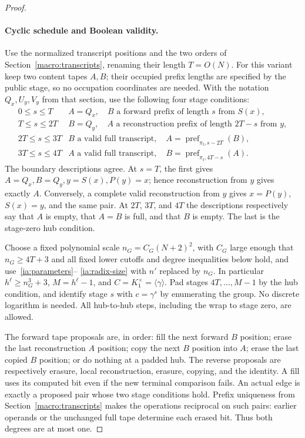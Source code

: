 \begin{proof}
\paragraph{Cyclic schedule and Boolean validity.}
Use the normalized transcript positions and the two orders of
Section~\ref{macro:transcripts}, renaming their length \(T=O(N)\).
For this variant keep two content tapes \(A,B\); their occupied
prefix lengths are specified by the public stage, so no occupation
coordinates are needed. With the notation \(Q_x,U_y,V_y\) from
that section, use the following four stage conditions:
\[
\begin{array}{c|l}
 0\le s\le T
   & A=Q_x,\quad B\text{ a forward prefix of length }s
                           \text{ from }S(x),\\
 T\le s\le2T
   & B=Q_y,\quad A\text{ a reconstruction prefix of length }2T-s
                           \text{ from }y,\\
 2T\le s\le3T
   & B\text{ a valid full transcript},\quad
                    A=\operatorname{pref}_{\pi_{\mathrm f},s-2T}(B),\\
 3T\le s\le4T
   & A\text{ a valid full transcript},\quad
                    B=\operatorname{pref}_{\pi_{\mathrm f},4T-s}(A).
\end{array}
\]
The boundary descriptions agree. At \(s=T\), the first gives
\(A=Q_x,B=Q_y,y=S(x),P(y)=x\); hence reconstruction from \(y\)
gives exactly \(A\). Conversely, a complete valid reconstruction
from \(y\) gives \(x=P(y)\), \(S(x)=y\), and the same pair.
At \(2T\), \(3T\), and \(4T\) the descriptions respectively say
that \(A\) is empty, that \(A=B\) is full, and that \(B\) is empty.
The last is the stage-zero hub condition.

Choose a fixed polynomial scale \(n_G=C_G(N+2)^2\), with \(C_G\)
large enough that \(n_G\ge4T+3\) and all fixed lower cutoffs and
degree inequalities below hold, and use~\eqref{ia:parameters}--
\eqref{ia:radix-size} with \(n'\) replaced by \(n_G\). In
particular \(h^\ell\ge n_G^3+3\), \(M=h^\ell-1\), and
\(C=K_1^\times=\langle\gamma\rangle\). Pad stages
\(4T,\ldots,M-1\) by the hub condition, and identify stage \(s\)
with \(c=\gamma^s\) by enumerating the group. No discrete logarithm
is needed. All hub-to-hub steps, including the wrap to stage zero,
are allowed.

The forward tape proposals are, in order: fill the next forward
\(B\) position; erase the last reconstruction \(A\) position;
copy the next \(B\) position into \(A\); erase the last copied
\(B\) position; or do nothing at a padded hub. The reverse proposals
are respectively erasure, local reconstruction, erasure, copying,
and the identity. A fill uses its computed bit even if the new
terminal comparison fails. An actual edge is exactly a proposed
pair whose two stage conditions hold. Prefix uniqueness from
Section~\ref{macro:transcripts} makes the operations reciprocal
on such pairs: earlier operands or the unchanged full tape determine
each erased bit. Thus both degrees are at most one.


\end{proof}
